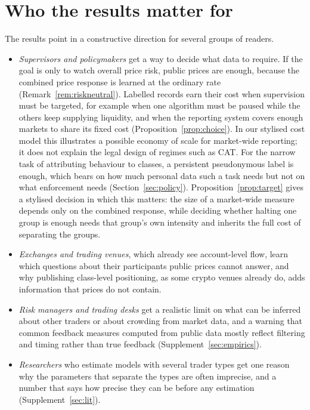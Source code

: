 \documentclass[12pt]{article}
\theoremstyle{definition}
\theoremstyle{remark}
\begin{document}
\section{Who the results matter for}\label{app:whomatters} The results point in a constructive direction for several groups of readers.
\begin{itemize}[itemsep=1pt]
\item \emph{Supervisors and policymakers} get a way to decide what data to require. If the goal is only to watch overall price risk, public prices are enough, because the combined price response is learned at the ordinary rate (Remark~\ref{rem:riskneutral}). Labelled records earn their cost when supervision must be targeted, for example when one algorithm must be paused while the others keep supplying liquidity, and when the reporting system covers enough markets to share its fixed cost (Proposition~\ref{prop:choice}). In our stylised cost model this illustrates a possible economy of scale for market-wide reporting; it does not explain the legal design of regimes such as CAT. For the narrow task of attributing behaviour to classes, a persistent pseudonymous label is enough, which bears on how much personal data such a task needs but not on what enforcement needs (Section~\ref{sec:policy}). Proposition~\ref{prop:target} gives a stylised decision in which this matters: the size of a market-wide measure depends only on the combined response, while deciding whether halting one group is enough needs that group's own intensity and inherits the full cost of separating the groups.
\item \emph{Exchanges and trading venues}, which already see account-level flow, learn which questions about their participants public prices cannot answer, and why publishing class-level positioning, as some crypto venues already do, adds information that prices do not contain.
\item \emph{Risk managers and trading desks} get a realistic limit on what can be inferred about other traders or about crowding from market data, and a warning that common feedback measures computed from public data mostly reflect filtering and timing rather than true feedback (Supplement~\ref{sec:empirics}).
\item \emph{Researchers} who estimate models with several trader types get one reason why the parameters that separate the types are often imprecise, and a number that says how precise they can be before any estimation (Supplement~\ref{sec:lit}).
\end{itemize}
\end{document}
